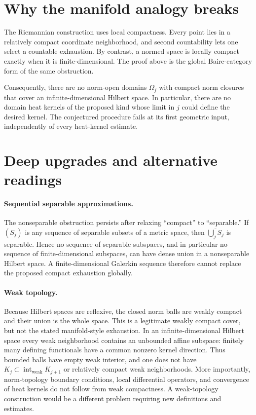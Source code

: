 \documentclass[11pt]{article}
\begin{document}
\section{Why the manifold analogy breaks}

The Riemannian construction uses local compactness.  Every point lies in a
relatively compact coordinate neighborhood, and second countability lets
one select a countable exhaustion.  By contrast, a normed space is locally
compact exactly when it is finite-dimensional.  The proof above is the
global Baire-category form of the same obstruction.

Consequently, there are no norm-open domains $\Omega_j$ with compact norm
closures that cover an infinite-dimensional Hilbert space.  In particular,
there are no domain heat kernels of the proposed kind whose limit in $j$
could define the desired kernel.  The conjectured procedure fails at its
first geometric input, independently of every heat-kernel estimate.

\section{Deep upgrades and alternative readings}

\paragraph{Sequential separable approximations.}
The nonseparable obstruction persists after relaxing ``compact'' to
``separable.''  If $(S_j)$ is any sequence of separable subsets of a metric
space, then $\overline{\bigcup_jS_j}$ is separable.  Hence no sequence of
separable subspaces, and in particular no sequence of finite-dimensional
subspaces, can have dense union in a nonseparable Hilbert space.  A
finite-dimensional Galerkin sequence therefore cannot replace the proposed
compact exhaustion globally.

\paragraph{Weak topology.}
Because Hilbert spaces are reflexive, the closed norm balls are weakly
compact and their union is the whole space.  This is a legitimate weakly
compact cover, but not the stated manifold-style exhaustion.  In an
infinite-dimensional Hilbert space every weak neighborhood contains an
unbounded affine subspace: finitely many defining functionals have a common
nonzero kernel direction.  Thus bounded balls have empty weak interior, and
one does not have
$K_j\subset\operatorname{int}_{\mathrm{weak}}K_{j+1}$ or relatively compact
weak neighborhoods.  More importantly, norm-topology boundary conditions,
local differential operators, and convergence of heat kernels do not follow
from weak compactness.  A weak-topology construction would be a different
problem requiring new definitions and estimates.
\end{document}
